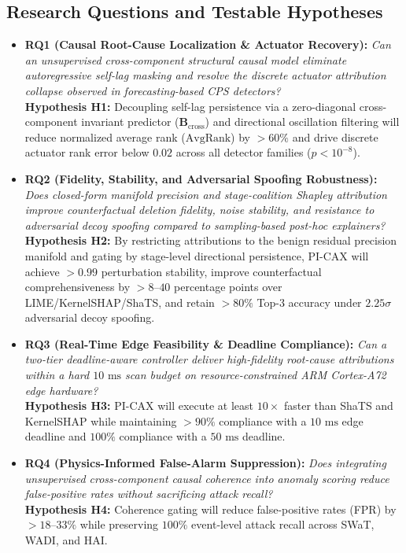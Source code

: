 \documentclass[10pt,a4paper]{article}
\begin{document}
\subsection{Research Questions and Testable Hypotheses}
\begin{itemize}\setlength{\itemsep}{2pt}\setlength{\parskip}{0pt}
    \item \textbf{RQ1 (Causal Root-Cause Localization \& Actuator Recovery):} \emph{Can an unsupervised cross-component structural causal model eliminate autoregressive self-lag masking and resolve the discrete actuator attribution collapse observed in forecasting-based CPS detectors?} \\
    \textbf{Hypothesis H1:} Decoupling self-lag persistence via a zero-diagonal cross-component invariant predictor ($\mathbf{B}_{\text{cross}}$) and directional oscillation filtering will reduce normalized average rank ($\text{AvgRank}$) by $>60\%$ and drive discrete actuator rank error below $0.02$ across all detector families ($p < 10^{-8}$).
    \item \textbf{RQ2 (Fidelity, Stability, and Adversarial Spoofing Robustness):} \emph{Does closed-form manifold precision and stage-coalition Shapley attribution improve counterfactual deletion fidelity, noise stability, and resistance to adversarial decoy spoofing compared to sampling-based post-hoc explainers?} \\
    \textbf{Hypothesis H2:} By restricting attributions to the benign residual precision manifold and gating by stage-level directional persistence, PI-CAX will achieve $>0.99$ perturbation stability, improve counterfactual comprehensiveness by $>8\text{--}40$ percentage points over LIME/KernelSHAP/ShaTS, and retain $>80\%$ Top-3 accuracy under $2.25\sigma$ adversarial decoy spoofing.
    \item \textbf{RQ3 (Real-Time Edge Feasibility \& Deadline Compliance):} \emph{Can a two-tier deadline-aware controller deliver high-fidelity root-cause attributions within a hard $10\text{ ms}$ scan budget on resource-constrained ARM Cortex-A72 edge hardware?} \\
    \textbf{Hypothesis H3:} PI-CAX will execute at least $10\times$ faster than ShaTS and KernelSHAP while maintaining $>90\%$ compliance with a $10\text{ ms}$ edge deadline and $100\%$ compliance with a $50\text{ ms}$ deadline.
    \item \textbf{RQ4 (Physics-Informed False-Alarm Suppression):} \emph{Does integrating unsupervised cross-component causal coherence into anomaly scoring reduce false-positive rates without sacrificing attack recall?} \\
    \textbf{Hypothesis H4:} Coherence gating will reduce false-positive rates (FPR) by $>18\text{--}33\%$ while preserving $100\%$ event-level attack recall across SWaT, WADI, and HAI.
\end{itemize}
\end{document}
